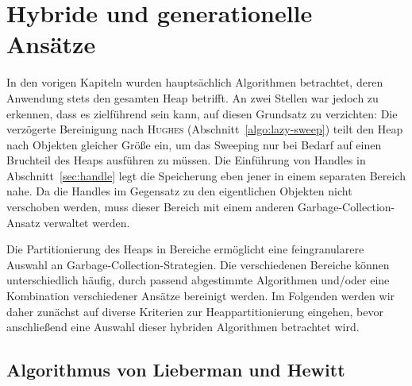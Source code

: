 \chapter{Hybride und generationelle Ansätze}
\label{cha:generational}

In den vorigen Kapiteln wurden hauptsächlich Algorithmen betrachtet, deren Anwendung stets den gesamten Heap betrifft.
An zwei Stellen war jedoch zu erkennen, dass es zielführend sein kann, auf diesen Grundsatz zu verzichten:
Die verzögerte Bereinigung nach \textsc{Hughes} (Abschnitt~\ref{algo:lazy-sweep}) teilt den Heap nach Objekten gleicher Größe ein, um das Sweeping nur bei Bedarf auf einen Bruchteil des Heaps ausführen zu müssen.
Die Einführung von Handles in Abschnitt~\ref{sec:handle} legt die Speicherung eben jener in einem separaten Bereich nahe.
Da die Handles im Gegensatz zu den eigentlichen Objekten nicht verschoben werden, muss dieser Bereich mit einem anderen Garbage-Collection-Ansatz verwaltet werden.

Die Partitionierung des Heaps in Bereiche ermöglicht eine feingranularere Auswahl an Garbage-Collection-Strategien.
Die verschiedenen Bereiche können unterschiedlich häufig, durch passend abgestimmte Algorithmen und/oder eine Kombination verschiedener Ansätze bereinigt werden.
Im Folgenden werden wir daher zunächst auf diverse Kriterien zur Heappartitionierung eingehen, bevor anschließend eine Auswahl dieser hybriden Algorithmen betrachtet wird.




\section{Algorithmus von Lieberman und Hewitt}
\label{sec:lieberman}

